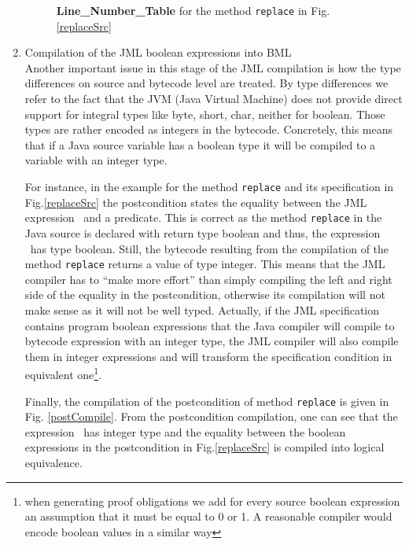 \documentclass[a4paper]{llncs}
\begin{document}
\begin{enumerate}
\begin{figure}[t]
\caption{\textbf{Line\_Number\_Table}  {\sc for the method } \texttt{replace} {\sc in Fig.  \ref{replaceSrc}  } }
\label{bml:compiler:loopEntry}
\end{figure} 

      
      
\item Compilation of the JML boolean expressions into BML \\
      
     

Another important issue in this stage of the JML compilation is how
the type differences on source and bytecode level are treated. By type
differences we refer to the fact that the JVM (Java Virtual Machine)
does not provide direct support for integral types like byte, short,
char, neither for boolean. Those types are rather encoded as integers
in the bytecode. Concretely, this means that if a Java source variable
has a boolean type it will be compiled to a variable with an integer
type.


 For instance, in the example for the method
\texttt{replace} and its specification in Fig.\ref{replaceSrc} the postcondition states the equality between the JML expression  
\result \ and a predicate. This is correct as the method \texttt{replace} in the Java source is declared with return type boolean  and thus,
 the expression \result \ has type boolean. Still, the bytecode
 resulting from the compilation of the method \texttt{replace} returns
 a value of type integer. This means that the JML compiler has to
 ``make more effort'' than simply compiling the left and right side of
 the equality in the postcondition, otherwise its compilation will not
 make sense as it will not be well typed. Actually, if the JML
 specification contains program boolean expressions that the Java
 compiler will compile to bytecode expression with an integer type,
 the JML compiler will also compile them in integer expressions and
 will transform the specification condition in equivalent
 one\footnote{when generating proof obligations we add for every
 source boolean expression an assumption that it must be equal to 0 or
 1. A reasonable compiler would encode boolean values in a similar
 way}.

Finally, the compilation of the postcondition of method
\texttt{replace} is given in Fig. \ref{postCompile}. From the
postcondition compilation, one can see that the expression \result \
has integer type and the equality between the boolean expressions in
the postcondition in Fig.\ref{replaceSrc} is compiled into logical
equivalence.


\end{enumerate}
\end{document}
